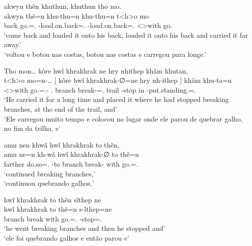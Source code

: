 \documentclass[output=paper,
modfonts,nonflat
]{langsci/langscibook}
\begin{document}
\ea  akwyn thẽn khuthun, khuthun tho mo. \\[.3em]
\gll akwyn thẽ=n             khu-thu=n                      khu-thu=n                      t<h>o        mo       \\
     back  go.\Sg=\AAnd.\Ss{} \Third-load.on.back=\AAnd.\Ss{} \Third-load.on.back=\AAnd.\Ss{} <\Third>with go.\Pl{} \\
\glt `came back and loaded it onto his back, loaded it onto his back and carried it far away.' \\
     `voltou e botou nas costas, botou nas costas e carregou para longe.' \\
\z

\ea  Tho mon\ldots{} kôre hwĩ khrakhrak ne hry nhithep khãm khutan, \\[.3em]
\gll t<h>o        mo=n-\ldots{}            [  kôre          hwĩ    khrakhrak-∅=ne           hry   nh-ithep ]  khãm khu-ta=n                           \\
     <\Third>with go.\Pl=\AAnd.\Ss-\Ints{} {} \Third.\Erg{} branch break-\Nmlz{}=\AAnd.\Ss{} trail \E-stop  {} in   \Third-put.standing.\Sg=\AAnd.\Ss{} \\
\glt `He carried it for a long time and placed it where he had stopped breaking branches, at the end of the trail, and' \\
     `Ele carregou muito tempo e colocou no lugar onde ele parou de quebrar galho, no fim da trilha, e' \\
\label{exe:koreemb}
\z

\ea  amu nen khwã hwĩ khrakhrak to thẽn, \\[.3em]
\gll amu     ne=n             kh-wã     hwĩ    khrakhrak-∅   to   thẽ=n             \\
     farther do.so=\AAnd.\Ss{} \Third-to branch break-\Nmlz{} with go.\Sg=\AAnd.\Ss{} \\
\glt `continued breaking branches,' \\
     `continuou quebrando galhos,' \\
\z

\ea  hwĩ khrakhrak to thẽn sĩthep ne \\[.3em]
\gll hwĩ    khrakhrak to   thẽ=n             s-ĩthep=ne             \\
     branch break     with go.\Sg=\AAnd.\Ss{} \Third-stop=\AAnd.\Ss{} \\
\glt `he went breaking branches and then he stopped and' \\
     `ele foi quebrando galhos e então parou e' \\
\z
\end{document}
